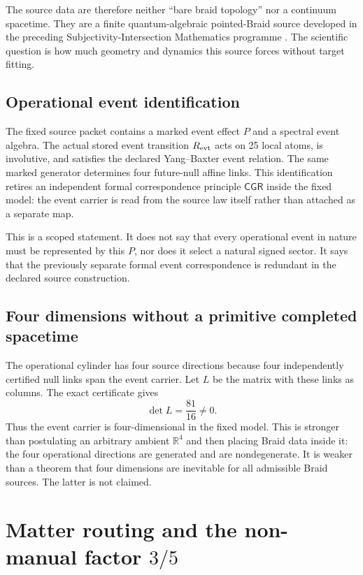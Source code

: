 \documentclass[11pt]{article}
\theoremstyle{definition}
\theoremstyle{remark}
\newcommand{\CGR}{\mathsf{CGR}}
\begin{document}
The source data are therefore neither ``bare braid topology'' \cite{artin1947} nor a continuum spacetime. They are a finite quantum-algebraic pointed-Braid source developed in the preceding Subjectivity-Intersection Mathematics programme \cite{watanabe2026braid,watanabe2026ontology}. The scientific question is how much geometry and dynamics this source forces without target fitting.

\subsection{Operational event identification}

The fixed source packet contains a marked event effect $P$ and a spectral event algebra. The actual stored event transition $R_{\rm evt}$ acts on 25 local atoms, is involutive, and satisfies the declared Yang--Baxter event relation. The same marked generator determines four future-null affine links. This identification retires an independent formal correspondence principle $\CGR$ inside the fixed model: the event carrier is read from the source law itself rather than attached as a separate map.

This is a scoped statement. It does not say that every operational event in nature must be represented by this $P$, nor does it select a natural signed sector. It says that the previously separate formal event correspondence is redundant in the declared source construction.

\subsection{Four dimensions without a primitive completed spacetime}

The operational cylinder has four source directions because four independently certified null links span the event carrier. Let $L$ be the matrix with these links as columns. The exact certificate gives
\begin{equation}
 \det L=\frac{81}{16}\neq0.
\end{equation}
Thus the event carrier is four-dimensional in the fixed model. This is stronger than postulating an arbitrary ambient $\mathbb R^4$ and then placing Braid data inside it: the four operational directions are generated and are nondegenerate. It is weaker than a theorem that four dimensions are inevitable for all admissible Braid sources. The latter is not claimed.

\section{Matter routing and the non-manual factor $3/5$}
\end{document}
